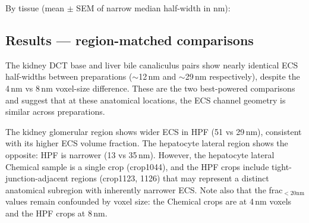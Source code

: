 \documentclass[times, twoside]{zHenriquesLab-StyleBioRxiv}
\begin{document}
By tissue (mean $\pm$ SEM of narrow median half-width in nm):

\begin{table}[h]
\centering
{}
\end{table}

\subsection*{Results --- region-matched comparisons}

\begin{table}[h]
\centering
\caption{ECS narrow half-width and fraction below 20\,nm for anatomically matched crop groups.}
\label{tab:width_matched}
\end{table}

The kidney DCT base and liver bile canaliculus pairs show nearly identical ECS half-widths between preparations ($\sim$12\,nm and $\sim$29\,nm respectively), despite the 4\,nm vs 8\,nm voxel-size difference. These are the two best-powered comparisons and suggest that at these anatomical locations, the ECS channel geometry is similar across preparations.

The kidney glomerular region shows wider ECS in HPF (51 vs 29\,nm), consistent with its higher ECS volume fraction. The hepatocyte lateral region shows the opposite: HPF is narrower (13 vs 35\,nm). However, the hepatocyte lateral Chemical sample is a single crop (crop1044), and the HPF crops include tight-junction-adjacent regions (crop1123, 1126) that may represent a distinct anatomical subregion with inherently narrower ECS. Note also that the frac$_{<20\text{nm}}$ values remain confounded by voxel size: the Chemical crops are at 4\,nm voxels and the HPF crops at 8\,nm.
\end{document}
